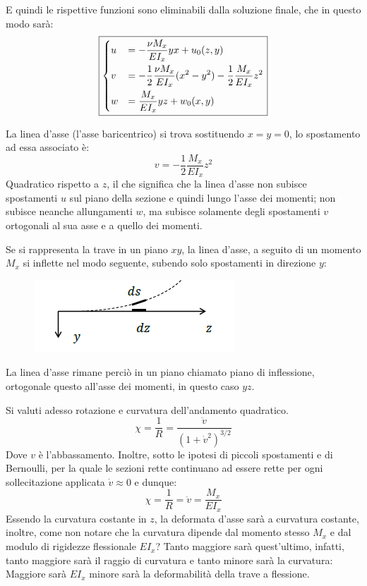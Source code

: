 		 E quindi le rispettive funzioni sono eliminabili dalla soluzione finale, che in questo modo sarà:
		\[\boxed{\begin{dcases}			
				u & = -\dfrac{\nu M_x}{EI_x}yx + u_0(z,y) \\
				v & = -\dfrac{1}{2}\dfrac{\nu M_x}{EI_x}(x^2 - y^2)  -\dfrac{1}{2}\dfrac{ M_x}{EI_x}z^2 \\
				w & = \dfrac{M_x}{EI_x}yz + w_0(x,y)	
		\end{dcases}} \]
		
		La linea d'asse (l'asse baricentrico) si trova sostituendo $x=y=0$, lo spostamento ad essa associato è:
		\[ v  = -\dfrac{1}{2}\dfrac{ M_x}{EI_x}z^2 \] 
		Quadratico rispetto a $z$, il che significa che la linea d'asse non subisce spostamenti $u$ sul piano della sezione e quindi lungo l'asse dei momenti; non subisce neanche allungamenti $w$, ma subisce solamente degli spostamenti $v$ ortogonali al sua asse e a quello dei momenti. \newline 
		
		Se si rappresenta la trave in un piano $xy$, la linea d'asse, a seguito di un momento $M_x$ si inflette nel modo seguente, subendo solo spostamenti in direzione $y$:
		
\begin{figure}[H]
	\centering
	\includegraphics[width=0.5\linewidth]{Immagini_3/screenshot003}
	\label{fig:screenshot003}
\end{figure}

		La linea d'asse rimane perciò in un piano chiamato piano di inflessione, ortogonale questo all'asse dei momenti, in questo caso $yz$. \newline 
		
		Si valuti adesso rotazione e curvatura dell'andamento quadratico. 
		\[ \chi = \dfrac{1}{R} = \dfrac{\ddot{v}}{(1+\dot{v}^2)^{3/2}}\]
		Dove $v$ è l'abbassamento. Inoltre, sotto le ipotesi di piccoli spostamenti e di Bernoulli, per la quale le sezioni rette continuano ad essere rette per ogni sollecitazione applicata $\dot{v}\approx 0$ e dunque: 
		\[ \chi = \dfrac{1}{R} = \ddot{v} = \dfrac{ M_x}{EI_x} \]
		Essendo la curvatura costante in $z$, la deformata d'asse sarà a curvatura costante, inoltre, come non notare che la curvatura dipende dal momento stesso $M_x$ e dal modulo di rigidezze flessionale $EI_x$? Tanto maggiore sarà quest'ultimo, infatti, tanto maggiore sarà il raggio di curvatura e tanto minore sarà la curvatura: Maggiore sarà $EI_x$ minore sarà la deformabilità della trave a flessione. \newline 
		
